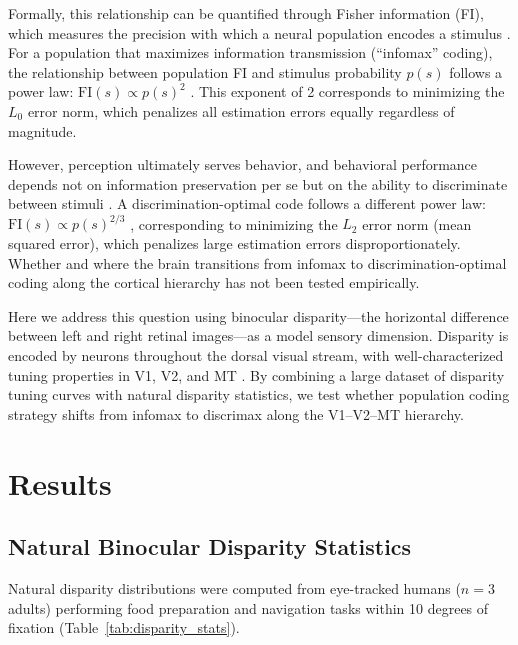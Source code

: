 \documentclass[11pt]{article}
\begin{document}
Formally, this relationship can be quantified through Fisher information (FI), which measures the precision with which a neural population encodes a stimulus \citep{fisher_information1925}. For a population that maximizes information transmission (``infomax'' coding), the relationship between population FI and stimulus probability $p(s)$ follows a power law: $\text{FI}(s) \propto p(s)^{2}$ \citep{ganguli2012efficient, wei2015bayesian}. This exponent of 2 corresponds to minimizing the $L_0$ error norm, which penalizes all estimation errors equally regardless of magnitude.

However, perception ultimately serves behavior, and behavioral performance depends not on information preservation per se but on the ability to discriminate between stimuli \citep{series2009tuning}. A discrimination-optimal code follows a different power law: $\text{FI}(s) \propto p(s)^{2/3}$ \citep{ganguli2012efficient}, corresponding to minimizing the $L_2$ error norm (mean squared error), which penalizes large estimation errors disproportionately. Whether and where the brain transitions from infomax to discrimination-optimal coding along the cortical hierarchy has not been tested empirically.

Here we address this question using binocular disparity---the horizontal difference between left and right retinal images---as a model sensory dimension. Disparity is encoded by neurons throughout the dorsal visual stream, with well-characterized tuning properties in V1, V2, and MT \citep{cumming2001binocular, deangelis1998cortical, prince2002quantitative}. By combining a large dataset of disparity tuning curves with natural disparity statistics, we test whether population coding strategy shifts from infomax to discrimax along the V1--V2--MT hierarchy.

\section{Results}

\subsection{Natural Binocular Disparity Statistics}

Natural disparity distributions were computed from eye-tracked humans ($n = 3$ adults) performing food preparation and navigation tasks within 10 degrees of fixation (Table~\ref{tab:disparity_stats}).
\end{document}
